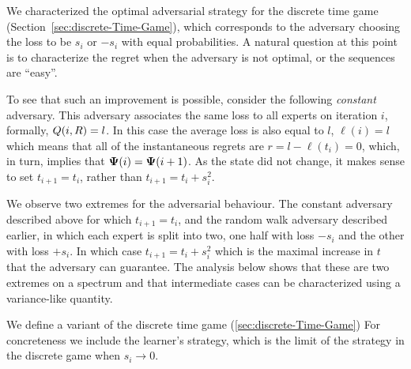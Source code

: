 \documentclass{article}[12pt]
\begin{document}
We characterized the optimal adversarial strategy for the discrete
time game (Section~\ref{sec:discrete-Time-Game}), which corresponds
to the adversary choosing the loss to be $s_i$ or $-s_i$ with equal
probabilities. A natural question at this point is to characterize the
regret when the adversary is not optimal, or the sequences are ``easy''.

To see that such an improvement is possible, consider the following
{\em constant} adversary. This adversary associates the same loss to
all experts on iteration $i$, formally, $Q(i,R) = l$. In this
case the average loss is also equal to $l$, $\ell(i)=l$ which means
that all of the instantaneous regrets are $r=l-\ell(t_i) = 0$, which,
in turn, implies that ${\bf \Psi}(i) = {\bf \Psi}(i+1)$. As the state did not
change, it makes sense to set $t_{i+1}=t_i$, rather than
$t_{i+1}=t_i+s_i^2$.

We observe two extremes for the adversarial behaviour. The constant
adversary described above for which $t_{i+1} = t_i$, and the random walk adversary described
earlier, in which each expert is split into two, one half with loss
$-s_i$ and the other with loss $+s_i$. In which case $t_{i+1} =
t_i+s_i^2$ which is the maximal increase in $t$ that the adversary can
guarantee. The analysis below shows that these are two extremes on a
spectrum and that intermediate cases can be characterized using a
variance-like quantity.

We define a variant of the discrete time game
(\ref{sec:discrete-Time-Game}) For concreteness we include the
learner's strategy, which is the limit of the strategy in the discrete
game when $s_i \to 0$.
\end{document}
